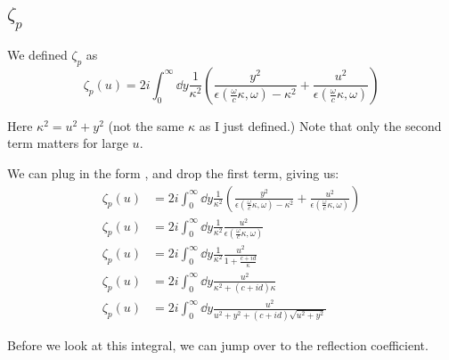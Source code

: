 \documentclass[../main.tex]{subfiles}
\begin{document}
	\subsection{$\zeta_p$} \label{subsec:zetap}

	We defined $\zeta_p$ as
	\begin{equation}
		\zeta_p(u) = 2i \int_0^\infty \dd{y} \frac{1}{\kappa^2} \left( \frac{y^2}{\epsilon(\frac{\omega}{c}\kappa, \omega) - \kappa^2} + \frac{u^2}{\epsilon(\frac{\omega}{c}\kappa, \omega)} \right)
	\end{equation}

	Here $\kappa^2 = u^2 + y^2$ (not the same $\kappa$ as I just defined.)
	Note that only the second term matters for large $u$.

	We can plug in the form , and drop the first term, giving us:
	\begin{align}
		\zeta_p(u) &= 2i \int_0^\infty \dd{y} \frac{1}{\kappa^2} \left( \frac{y^2}{\epsilon(\frac{\omega}{c}\kappa, \omega) - \kappa^2} + \frac{u^2}{\epsilon(\frac{\omega}{c}\kappa, \omega)} \right) \\
		\zeta_p(u) &= 2i \int_0^\infty \dd{y} \frac{1}{\kappa^2} \frac{u^2}{\epsilon(\frac{\omega}{c}\kappa, \omega)} \\
		\zeta_p(u) &= 2i \int_0^\infty \dd{y} \frac{1}{\kappa^2} \frac{u^2}{1 + \frac{c + i d}{\kappa}} \\
		\zeta_p(u) &= 2i \int_0^\infty \dd{y} \frac{u^2}{\kappa^2 + (c + id)\kappa} \\
		\zeta_p(u) &= 2i \int_0^\infty \dd{y} \frac{u^2}{u^2 + y^2 + (c + id)\sqrt{u^2 + y^2}} \label{eq:zetaPreZ}
	\end{align}

	Before we look at this integral, we can jump over to the reflection coefficient.
\end{document}
